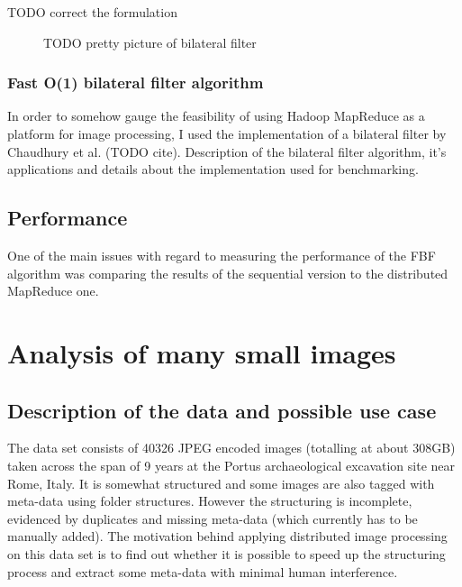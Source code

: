 \documentclass [12pt,a4paper]{report}
\begin{document}
TODO correct the formulation

\begin{center}
\begin{figure}[h]
\caption{TODO pretty picture of bilateral filter}
\label{fig_gaussian_blur}
\end{figure}
\end{center}

\subsubsection{Fast O(1) bilateral filter algorithm}

In order to somehow gauge the feasibility of using Hadoop MapReduce as a platform for image processing, I used the implementation of a bilateral filter by Chaudhury et al. (TODO cite).
Description of the bilateral filter algorithm, it's applications and details about the implementation used for benchmarking.

\subsubsection{}

\subsection{Performance}

One of the main issues with regard to measuring the performance of the FBF algorithm was comparing the results of the sequential version to the distributed MapReduce one.

\section{Analysis of many small images}

\subsection{Description of the data and possible use case}

The data set consists of 40326 JPEG encoded images (totalling at about 308GB) taken across the span of 9 years at the Portus archaeological excavation site near Rome, Italy. It is somewhat structured and some images are also tagged with meta-data using folder structures. However the structuring is incomplete, evidenced by duplicates and missing meta-data (which currently has to be manually added). The motivation behind applying distributed image processing on this data set is to find out whether it is possible to speed up the structuring process and extract some meta-data with minimal human interference.
\end{document}
